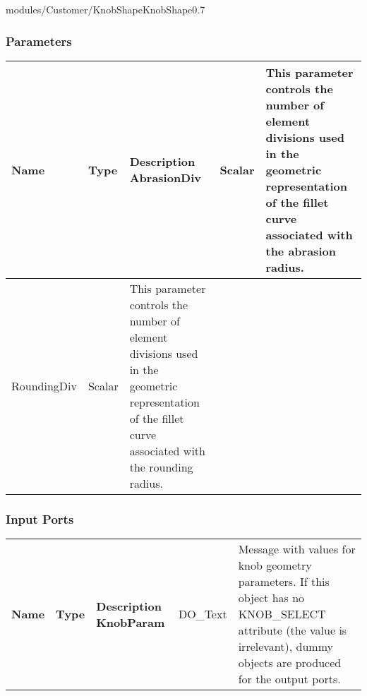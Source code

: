 \begin{htmlonly}
%
\begin{covimg2}{modules/Customer/KnobShape}{KnobShape}{0.7}\end{covimg2}



%
%

%
\subsubsection{Parameters}
%

\begin{longtable}{|p{3cm}|p{2cm}|p{8.5cm}|}
\hline
   \bf{Name} & \bf{Type} & \bf{Description} \endhead
\hline\hline
        AbrasionDiv & Scalar & This parameter controls the number of element divisions
              used in the geometric representation of the fillet curve associated 
              with the abrasion radius.\\
\hline
        RoundingDiv & Scalar & This parameter controls the number of element divisions
              used in the geometric representation of the fillet curve associated 
              with the rounding radius.\\
\hline
\end{longtable}



%
\subsubsection{Input Ports}
%


\begin{longtable}{|p{2.5cm}|p{4.5cm}|p{7cm}|}
\hline
   \bf{Name} & \bf{Type} & \bf{Description} \endhead
\hline\hline
	\textcolor{required}{KnobParam} & DO\_Text & Message with
                 values for knob geometry parameters. If this object
                 has no KNOB\_SELECT attribute (the value is irrelevant),
                 dummy objects are produced for the output ports.\\
                     

\end{longtable}
\end{htmlonly}
